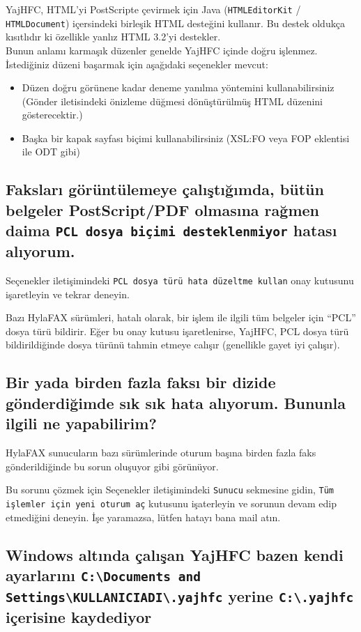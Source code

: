 \documentclass[a4paper,10pt]{scrartcl}
\begin{document}
YajHFC, HTML'yi PostScripte çevirmek için Java (\texttt{HTMLEditorKit} / \texttt{HTMLDocument}) içersindeki birleşik HTML desteğini kullanır. Bu destek oldukça kısıtlıdır ki özellikle yanlız HTML 3.2'yi destekler.\\
Bunun anlamı karmaşık düzenler genelde YajHFC içinde doğru işlenmez.
İstediğiniz düzeni başarmak için aşağıdaki seçenekler mevcut:

\begin{itemize}
 \item Düzen doğru görünene kadar deneme yanılma yöntemini kullanabilirsiniz (Gönder iletisindeki önizleme düğmesi dönüştürülmüş HTML düzenini gösterecektir.)
 \item Başka bir kapak sayfası biçimi kullanabilirsiniz (XSL:FO veya FOP eklentisi ile ODT gibi)
\end{itemize}

\subsection{Faksları görüntülemeye çalıştığımda, bütün belgeler PostScript/PDF olmasına rağmen daima 
   \texttt{PCL dosya biçimi desteklenmiyor} hatası alıyorum.}

Seçenekler iletişimindeki \texttt{PCL dosya türü hata düzeltme kullan} onay kutusunu işaretleyin ve tekrar deneyin.

Bazı HylaFAX sürümleri, hatalı olarak, bir işlem ile ilgili tüm belgeler için
``PCL'' dosya türü bildirir. Eğer bu onay kutusu işaretlenirse, YajHFC, 
PCL dosya türü bildirildiğinde dosya türünü tahmin etmeye calışır (genellikle gayet iyi çalışır). 


\subsection{Bir yada birden fazla faksı bir dizide gönderdiğimde sık sık hata alıyorum. Bununla ilgili ne yapabilirim?}

HylaFAX sunucuların bazı sürümlerinde oturum başına birden fazla faks gönderildiğinde bu sorun oluşuyor gibi görünüyor.

Bu sorunu çözmek için Seçenekler iletişimindeki \texttt{Sunucu} sekmesine gidin, \texttt{Tüm işlemler için yeni oturum aç} kutusunu işaterleyin ve sorunun devam edip etmediğini deneyin.
İşe yaramazsa, lütfen hatayı bana mail atın.

\subsection{Windows altında çalışan YajHFC bazen kendi ayarlarını \texttt{C:\textbackslash Documents and Settings\textbackslash KULLANICIADI\textbackslash .yajhfc} yerine \texttt{C:\textbackslash .yajhfc} içerisine kaydediyor}
\end{document}
